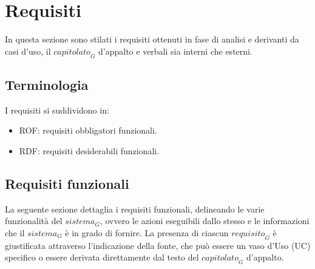 \documentclass[12pt, oneside]{article}
\begin{document}














\newpage











%
%

%

%

\section{Requisiti}
In questa sezione sono stilati i requisiti ottenuti in fase di analisi e derivanti da casi d'uso, il $\textit{capitolato}_G$ d'appalto e verbali sia interni che esterni. 
\subsection{Terminologia}
I requisiti si suddividono in:
\begin{itemize}
    \item ROF: requisiti obbligatori funzionali.
    \item RDF: requisiti desiderabili funzionali.
\end{itemize}
\subsection{Requisiti funzionali}
La seguente sezione dettaglia i requisiti funzionali, delineando le varie funzionalità del $\textit{sistema}_G$, ovvero le azioni eseguibili dallo stesso e le informazioni che il $\textit{sistema}_G$ è in grado di fornire. La presenza di ciascun $\textit{requisito}_G$ è giustificata attraverso l'indicazione della fonte, che può essere un vaso d'Uso (UC) specifico o essere derivata direttamente dal testo del $\textit{capitolato}_G$ d'appalto.
\end{document}
